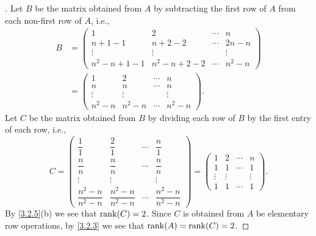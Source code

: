 \begin{proof}[]
  Let \(B\) be the matrix obtained from \(A\) by subtracting the first row of \(A\) from each non-first row of \(A\), i.e.,
  \begin{align*}
    B & = \begin{pmatrix}
            1               & 2               & \cdots & n       \\
            n + 1 - 1       & n + 2 - 2       & \cdots & 2n - n  \\
            \vdots          & \vdots          &        & \vdots  \\
            n^2 - n + 1 - 1 & n^2 - n + 2 - 2 & \cdots & n^2 - n
          \end{pmatrix} \\
      & = \begin{pmatrix}
            1       & 2       & \cdots & n       \\
            n       & n       & \cdots & n       \\
            \vdots  & \vdots  &        & \vdots  \\
            n^2 - n & n^2 - n & \cdots & n^2 - n
          \end{pmatrix}.
  \end{align*}
  Let \(C\) be the matrix obtained from \(B\) by dividing each row of \(B\) by the first entry of each row, i.e.,
  \[
    C = \begin{pmatrix}
      \dfrac{1}{1}             & \dfrac{2}{1}             & \cdots & \dfrac{n}{1}             \\
      \dfrac{n}{n}             & \dfrac{n}{n}             & \cdots & \dfrac{n}{n}             \\
      \vdots                   & \vdots                   &        & \vdots                   \\
      \dfrac{n^2 - n}{n^2 - n} & \dfrac{n^2 - n}{n^2 - n} & \cdots & \dfrac{n^2 - n}{n^2 - n}
    \end{pmatrix} = \begin{pmatrix}
      1      & 2      & \cdots & n      \\
      1      & 1      & \cdots & 1      \\
      \vdots & \vdots &        & \vdots \\
      1      & 1      & \cdots & 1
    \end{pmatrix}.
  \]
  By \cref{3.2.5}(b) we see that \(\rk{C} = 2\).
  Since \(C\) is obtained from \(A\) be elementary row operations, by \cref{3.2.3} we see that \(\rk{A} = \rk{C} = 2\).

\end{proof}
